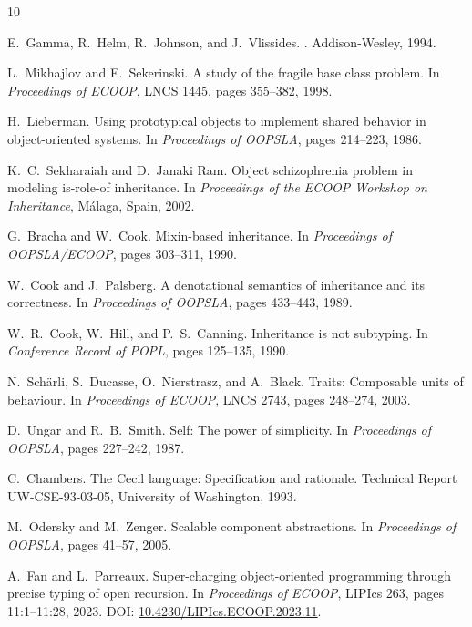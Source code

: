 \documentclass[acmsmall,screen,review,anonymous]{acmart}
\theoremstyle{acmplain}
\begin{document}
\begin{thebibliography}{10}

E.~Gamma, R.~Helm, R.~Johnson, and J.~Vlissides.
.
\newblock Addison-Wesley, 1994.

L.~Mikhajlov and E.~Sekerinski.
\newblock A study of the fragile base class problem.
\newblock In {\em Proceedings of ECOOP}, LNCS 1445, pages 355--382, 1998.

H.~Lieberman.
\newblock Using prototypical objects to implement shared behavior in
  object-oriented systems.
\newblock In {\em Proceedings of OOPSLA}, pages 214--223, 1986.

K.~C.~Sekharaiah and D.~Janaki Ram.
\newblock Object schizophrenia problem in modeling is-role-of inheritance.
\newblock In {\em Proceedings of the ECOOP Workshop on Inheritance}, M{\'a}laga, Spain, 2002.

G.~Bracha and W.~Cook.
\newblock Mixin-based inheritance.
\newblock In {\em Proceedings of OOPSLA/ECOOP}, pages 303--311, 1990.

W.~Cook and J.~Palsberg.
\newblock A denotational semantics of inheritance and its correctness.
\newblock In {\em Proceedings of OOPSLA}, pages 433--443, 1989.

W.~R.~Cook, W.~Hill, and P.~S.~Canning.
\newblock Inheritance is not subtyping.
\newblock In {\em Conference Record of POPL}, pages 125--135, 1990.

N.~Sch{\"a}rli, S.~Ducasse, O.~Nierstrasz, and A.~Black.
\newblock Traits: Composable units of behaviour.
\newblock In {\em Proceedings of ECOOP}, LNCS 2743, pages 248--274, 2003.

D.~Ungar and R.~B.~Smith.
\newblock Self: The power of simplicity.
\newblock In {\em Proceedings of OOPSLA}, pages 227--242, 1987.

C.~Chambers.
\newblock The {Cecil} language: Specification and rationale.
\newblock Technical Report UW-CSE-93-03-05, University of Washington, 1993.

M.~Odersky and M.~Zenger.
\newblock Scalable component abstractions.
\newblock In {\em Proceedings of OOPSLA}, pages 41--57, 2005.

A.~Fan and L.~Parreaux.
\newblock Super-charging object-oriented programming through precise typing of open recursion.
\newblock In {\em Proceedings of ECOOP}, LIPIcs 263, pages 11:1--11:28, 2023.
\newblock DOI: \href{https://doi.org/10.4230/LIPIcs.ECOOP.2023.11}{10.4230/LIPIcs.ECOOP.2023.11}.


\end{thebibliography}
\end{document}

